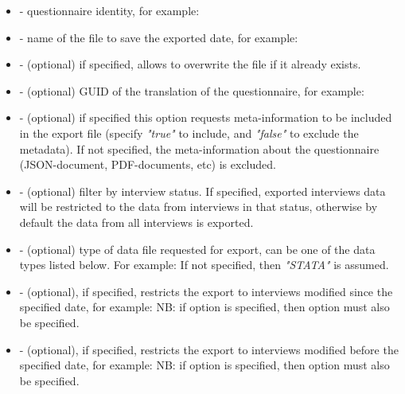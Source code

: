 \optsheader
\begin{itemize}
    \item {} - questionnaire identity, for example:

    \item {} - name of the file to save the exported date, for example:

    \item {} - (optional) if specified, allows to overwrite the
    file if it already exists.

    \item {} - (optional) GUID of the translation of the
    questionnaire, for example:

    \item {} - (optional) if specified this option requests
    meta-information to be included in the export file (specify
    \textit{"true"} to include, and \textit{"false"} to exclude the metadata).
    If not specified, the meta-information about the questionnaire
    (JSON-document, PDF-documents, etc) is excluded.

    \item {} - (optional) filter by interview status. If specified,
    exported interviews data will be restricted to the data from interviews in
    that status, otherwise by default the data from all interviews is exported.

    \item {} - (optional) type of data file requested for
    export, can be one of the data types listed below. For example:
     \newline
    If not specified, then \textit{"STATA"} is assumed.

    \item {} - (optional), if specified, restricts the export to
    interviews modified since the specified date, for example:
     \newline
    NB: if option  is specified, then option  must
    also be specified.

    \item {} - (optional), if specified, restricts the export to
    interviews modified before the specified date, for example:
     \newline
    NB: if option  is specified, then option  must
    also be specified.

\end{itemize}

